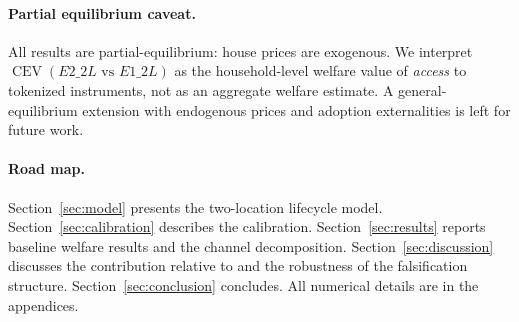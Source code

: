 \paragraph{Partial equilibrium caveat.}
All results are partial-equilibrium: house prices are exogenous.
We interpret $\operatorname{CEV}(E2\_2L \text{ vs } E1\_2L)$ as the
household-level welfare value of \emph{access} to tokenized instruments,
not as an aggregate welfare estimate.
A general-equilibrium extension with endogenous prices and adoption externalities
is left for future work.

\paragraph{Road map.}
Section~\ref{sec:model} presents the two-location lifecycle model.
Section~\ref{sec:calibration} describes the calibration.
Section~\ref{sec:results} reports baseline welfare results and the channel
decomposition.
Section~\ref{sec:discussion} discusses the contribution relative to
\citet{Liu2021} and the robustness of the falsification structure.
Section~\ref{sec:conclusion} concludes.
All numerical details are in the appendices.
